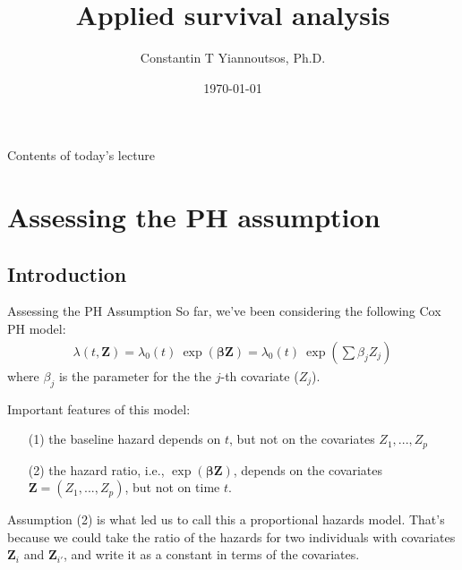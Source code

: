 \documentclass[envcountsect, 10pt, portrait, palatino]{beamer}
\title[]{Applied survival analysis}
\author[Constantin T Yiannoutsos]
{ Constantin T Yiannoutsos, Ph.D.}
\date[]{\today}
\begin{document}
\begin{frame}
  \titlepage
\end{frame}
\begin{frame}{Contents of today's lecture}
  \tableofcontents
\end{frame}
\section{Assessing the PH assumption}
\subsection{Introduction}
\begin{frame}{Assessing the PH Assumption}
So far, we've been considering the following Cox PH model:
\begin{eqnarray*}
\lambda(t,\mathbf{Z}) = \lambda_0(t) ~ \exp(\mathbf{\beta} \mathbf{Z})
                  = \lambda_0(t) ~\exp\left(\sum \beta_j Z_j\right)
\end{eqnarray*}
where $\beta_j$ is the parameter for the the $j$-th covariate ($Z_j$).
\end{frame}
\begin{frame}{ Important features of this model:}
\begin{itemize}
\item[(1)] the baseline hazard depends on $t$, but not on the covariates
$Z_1,...,Z_p$
\item[(2)] the hazard ratio, i.e., $\exp(\mathbf{\beta} \mathbf{Z})$, depends on
the covariates $\mathbf{Z}=(Z_1,...,Z_p)$, but not on time $t$.
\end{itemize}

Assumption (2) is what led us to call this a proportional
hazards model.  That's because we could take the ratio of the
hazards for two individuals with covariates $\mathbf{Z}_{i}$ and
$\mathbf{Z}_{i'}$, and write it as a constant in terms of the covariates.
\end{frame}
\end{document}
